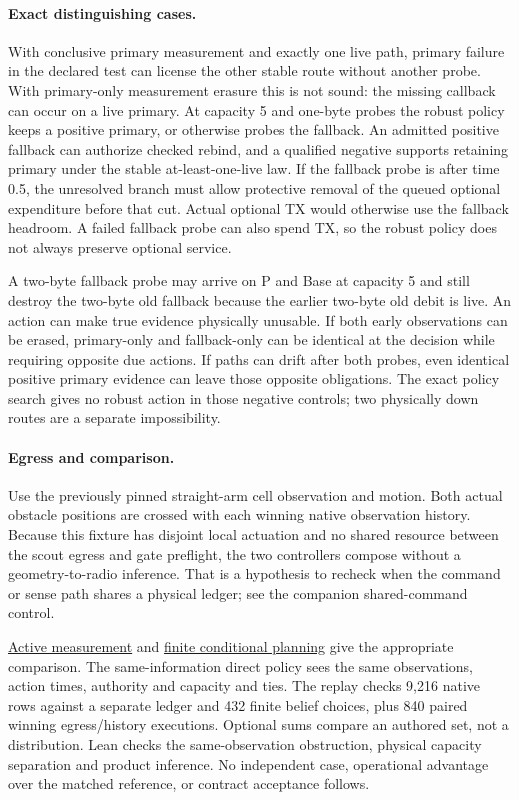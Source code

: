 \documentclass[11pt]{article}
\begin{document}
\paragraph{Exact distinguishing cases.}
With conclusive primary measurement and exactly one live path, primary
failure in the declared test can license the other stable route without
another probe. With primary-only measurement erasure this is not sound:
the missing callback can occur on a live primary. At capacity 5 and
one-byte probes the robust policy keeps a positive primary, or otherwise
probes the fallback. An admitted positive fallback can authorize checked
rebind, and a qualified negative supports retaining primary under the
stable at-least-one-live law. If the fallback probe is after time 0.5,
the unresolved branch must allow protective removal of the queued
optional expenditure before that cut. Actual optional TX would otherwise
use the fallback headroom. A failed fallback probe can also spend TX,
so the robust policy does not always preserve optional service.

A two-byte fallback probe may arrive on P and Base at capacity 5
and still destroy the two-byte old fallback because the earlier
two-byte old debit is live. An action can make true evidence physically
unusable. If both early observations can be erased, primary-only and
fallback-only can be identical at the decision while requiring opposite
due actions. If paths can drift after both probes, even identical
positive primary evidence can leave those opposite obligations.
The exact policy search gives no robust action in those negative
controls; two physically down routes are a separate impossibility.

\paragraph{Egress and comparison.}
Use the previously pinned straight-arm cell observation and motion.
Both actual obstacle positions are crossed with each winning native
observation history. Because this fixture has disjoint local actuation
and no shared resource between the scout egress and gate preflight,
the two controllers compose without a geometry-to-radio inference.
That is a hypothesis to recheck when the command or sense path
shares a physical ledger; see the companion shared-command control.

\href{https://datatracker.ietf.org/doc/html/rfc7799}{Active measurement}
and \href{https://www.cassandra.org/arc/papers/aij98.pdf}
{finite conditional planning} give the appropriate comparison.
The same-information direct policy sees the same observations,
action times, authority and capacity and ties. The replay checks
9,216 native rows against a separate ledger and 432 finite belief
choices, plus 840 paired winning egress/history executions.
Optional sums compare an authored set, not a distribution.
Lean checks the same-observation obstruction, physical capacity
separation and product inference. No independent case, operational
advantage over the matched reference, or contract acceptance follows.
\end{document}
